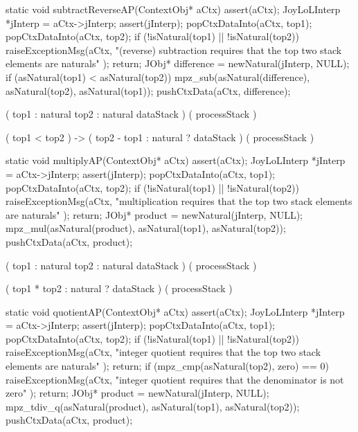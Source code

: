 \stopWord

\stoptyping

\startCCode
static void subtractReverseAP(ContextObj* aCtx) {
  assert(aCtx);
  JoyLoLInterp *jInterp = aCtx->jInterp;
  assert(jInterp);
  popCtxDataInto(aCtx, top1);
  popCtxDataInto(aCtx, top2);
  if (!isNatural(top1) || !isNatural(top2)) {
    raiseExceptionMsg(aCtx,
      "(reverse) subtraction requires that the top two stack elements are naturals"
    );
    return;
  }
  JObj* difference = newNatural(jInterp, NULL);
  if (asNatural(top1) < asNatural(top2)) {
    mpz_sub(asNatural(difference), asNatural(top2), asNatural(top1));
  }
  pushCtxData(aCtx, difference);
}
\stopCCode

\starttyping

\startWord[subtractReverse]

\preDataStack
  (
    top1 : natural
    top2 : natural
    dataStack
  )
\preProcessStack
  ( processStack )
\preConditions
\stopPreStack

\postDataStack
  ( top1 < top2 ) -> (
    top2 - top1 : natural ?
    dataStack
  )
\postProcessStack
  ( processStack )
\postConditions
\stopPostStack

\stopWord

\stoptyping

\startCCode
static void multiplyAP(ContextObj* aCtx) {
  assert(aCtx);
  JoyLoLInterp *jInterp = aCtx->jInterp;
  assert(jInterp);
  popCtxDataInto(aCtx, top1);
  popCtxDataInto(aCtx, top2);
  if (!isNatural(top1) || !isNatural(top2)) {
    raiseExceptionMsg(aCtx,
      "multiplication requires that the top two stack elements are naturals"
    );
    return;
  }
  JObj* product = newNatural(jInterp, NULL);
  mpz_mul(asNatural(product), asNatural(top1), asNatural(top2));
  pushCtxData(aCtx, product);
}
\stopCCode

\starttyping

\startWord[mulitply]

\preDataStack
  (
    top1 : natural
    top2 : natural
    dataStack
  )
\preProcessStack
  ( processStack )
\preConditions
\stopPreStack

\postDataStack
  (
    top1 * top2 : natural ?
    dataStack
  )
\postProcessStack
  ( processStack )
\postConditions
\stopPostStack

\stopWord

\stoptyping

\startCCode
static void quotientAP(ContextObj* aCtx) {
  assert(aCtx);
  JoyLoLInterp *jInterp = aCtx->jInterp;
  assert(jInterp);
  popCtxDataInto(aCtx, top1);
  popCtxDataInto(aCtx, top2);
  if (!isNatural(top1) || !isNatural(top2)) {
    raiseExceptionMsg(aCtx,
      "integer quotient requires that the top two stack elements are naturals"
    );
    return;
  }
  if (mpz_cmp(asNatural(top2), zero) == 0) {
    raiseExceptionMsg(aCtx,
      "integer quotient requires that the denominator is not zero"
    );
    return;
  }
  JObj* product = newNatural(jInterp, NULL);
  mpz_tdiv_q(asNatural(product), asNatural(top1), asNatural(top2));
  pushCtxData(aCtx, product);
}

